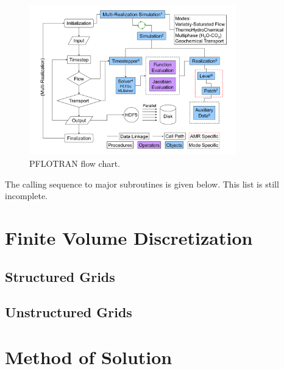 \documentclass[12pt]{article}
\begin{document}
\begin{figure}[ht]\centering
\includegraphics[width=0.8\textwidth]{./figs/multi-realization_flowchart}

\vspace{3mm}

\caption{PFLOTRAN flow chart.}
\label{fchart}
\end{figure}

\noindent
The calling sequence to major subroutines is given below. This list is still incomplete.


\normalsize


\section{Finite Volume Discretization}

\subsection{Structured Grids}

\subsection{Unstructured Grids}


\section{Method of Solution}
\end{document}
